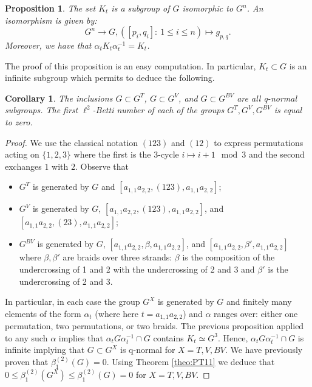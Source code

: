 \documentclass[a4paper, 12pt]{amsart}
\numberwithin{equation}{section}
\newtheorem{corollary}[theorem]{Corollary}
\newtheorem{proposition}[theorem]{Proposition}
\theoremstyle{definition}
\newcommand{\betti}{\beta^{(2)}_1}
\begin{document}
\begin{proposition}
The set $K_t$ is a subgroup of $G$ isomorphic to $G^n$.
An isomorphism is given by:
$$G^n\to G, ([p_i,q_i]:\ 1\leq i\leq n)\mapsto g_{p,q}.$$
Moreover, we have that $\alpha_t K_t \alpha_t^{-1} = K_t$.
\end{proposition}

The proof of this proposition is an easy computation.
In particular, $K_t\subset G$ is an infinite subgroup which permits to deduce the following.

\begin{corollary}
The inclusions $G\subset G^T$, $G\subset G^V$, and $G\subset G^{BV}$ are all q-normal subgroups.
The first $\ell^2$-Betti number of each of the groups $G^T,G^V,G^{BV}$ is equal to zero.
\end{corollary}

\begin{proof}
We use the classical notation $(123)$ and $(12)$ to express permutations acting on $\{1,2,3\}$ where the first is the 3-cycle $i\mapsto i+1 \mod 3$ and the second exchanges $1$ with $2$.
Observe that 
\begin{itemize}
\item $G^T$ is generated by $G$ and $[a_{1,1}a_{2,2}, (123), a_{1,1}a_{2,2}]$;\\
\item $G^V$ is generated by $G$, $[a_{1,1}a_{2,2}, (123), a_{1,1}a_{2,2}]$, and $[a_{1,1}a_{2,2}, (23), a_{1,1}a_{2,2}]$;\\
\item $G^{BV}$ is generated by $G$, $[a_{1,1}a_{2,2}, \beta, a_{1,1}a_{2,2}]$, and $[a_{1,1}a_{2,2},\beta',a_{1,1}a_{2,2}]$ where $\beta,\beta'$ are braids over three strands: $\beta$ is the composition of the undercrossing of 1 and 2 with the undercrossing of 2 and 3 and $\beta'$ is the undercrossing of 2 and 3.
\end{itemize}
In particular, in each case the group $G^X$ is generated by $G$ and finitely many elements of the form $\alpha_t$ (where here $t=a_{1,1}a_{2,2}$) and $\alpha$ ranges over: either one permutation, two permutations, or two braids.
The previous proposition applied to any such $\alpha$ implies that $\alpha_t G \alpha_t^{-1}\cap G$ contains $K_t\simeq G^3$.
Hence, $\alpha_t G \alpha_t^{-1}\cap G$ is infinite implying that $G\subset G^X$ is q-normal for $X=T,V,BV$.
We have previously proven that $\betti(G)=0$.
Using Theorem \ref{theo:PT11} we deduce that $0\leq \betti(G^X)\leq \betti(G)=0$ for $X=T,V,BV$.
\end{proof}
\end{document}
